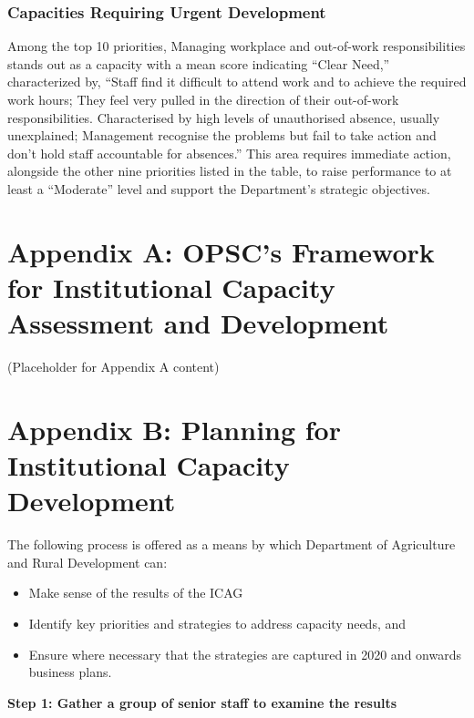 \documentclass[
  10pt,
]{report}
\providecommand{\tightlist}{%
  \setlength{\itemsep}{0pt}\setlength{\parskip}{0pt}}
\begin{document}
\subsection{Capacities Requiring Urgent
Development}\label{capacities-requiring-urgent-development}

Among the top 10 priorities, Managing workplace and out-of-work
responsibilities stands out as a capacity with a mean score indicating
``Clear Need,'' characterized by, ``Staff find it difficult to attend
work and to achieve the required work hours; They feel very pulled in
the direction of their out-of-work responsibilities. Characterised by
high levels of unauthorised absence, usually unexplained; Management
recognise the problems but fail to take action and don't hold staff
accountable for absences.'' This area requires immediate action,
alongside the other nine priorities listed in the table, to raise
performance to at least a ``Moderate'' level and support the
Department's strategic objectives.

\chapter{Appendix A: OPSC's Framework for Institutional Capacity
Assessment and
Development}\label{appendix-a-opscs-framework-for-institutional-capacity-assessment-and-development}

(Placeholder for Appendix A content)

\chapter{Appendix B: Planning for Institutional Capacity
Development}\label{appendix-b-planning-for-institutional-capacity-development}

The following process is offered as a means by which Department of
Agriculture and Rural Development can:

\begin{itemize}
\tightlist
\item
  Make sense of the results of the ICAG
\item
  Identify key priorities and strategies to address capacity needs, and
\item
  Ensure where necessary that the strategies are captured in 2020 and
  onwards business plans.
\end{itemize}

\textbf{Step 1: Gather a group of senior staff to examine the results}
\end{document}

